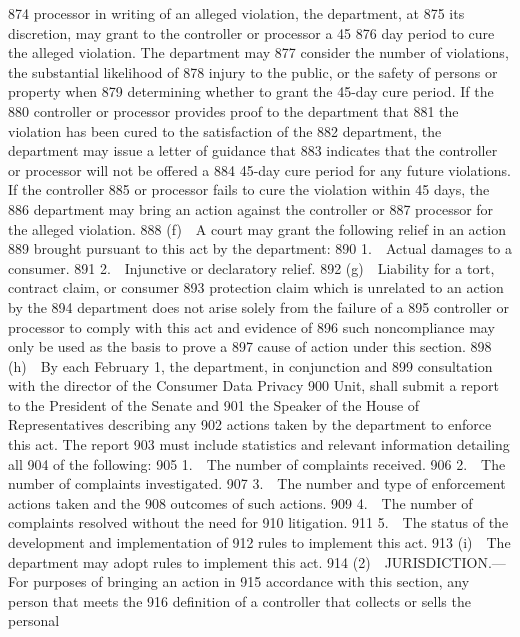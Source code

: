   874  processor in writing of an alleged violation, the department, at
  875  its discretion, may grant to the controller or processor a 45
  876  day period to cure the alleged violation. The department may
  877  consider the number of violations, the substantial likelihood of
  878  injury to the public, or the safety of persons or property when
  879  determining whether to grant the 45-day cure period. If the
  880  controller or processor provides proof to the department that
  881  the violation has been cured to the satisfaction of the
  882  department, the department may issue a letter of guidance that
  883  indicates that the controller or processor will not be offered a
  884  45-day cure period for any future violations. If the controller
  885  or processor fails to cure the violation within 45 days, the
  886  department may bring an action against the controller or
  887  processor for the alleged violation.
  888         (f) A court may grant the following relief in an action
  889  brought pursuant to this act by the department:
  890         1. Actual damages to a consumer.
  891         2. Injunctive or declaratory relief.
  892         (g) Liability for a tort, contract claim, or consumer
  893  protection claim which is unrelated to an action by the
  894  department does not arise solely from the failure of a
  895  controller or processor to comply with this act and evidence of
  896  such noncompliance may only be used as the basis to prove a
  897  cause of action under this section.
  898         (h) By each February 1, the department, in conjunction and
  899  consultation with the director of the Consumer Data Privacy
  900  Unit, shall submit a report to the President of the Senate and
  901  the Speaker of the House of Representatives describing any
  902  actions taken by the department to enforce this act. The report
  903  must include statistics and relevant information detailing all
  904  of the following:
  905         1. The number of complaints received.
  906         2. The number of complaints investigated.
  907         3. The number and type of enforcement actions taken and the
  908  outcomes of such actions.
  909         4. The number of complaints resolved without the need for
  910  litigation.
  911         5. The status of the development and implementation of
  912  rules to implement this act.
  913         (i) The department may adopt rules to implement this act.
  914         (2) JURISDICTION.—For purposes of bringing an action in
  915  accordance with this section, any person that meets the
  916  definition of a controller that collects or sells the personal
